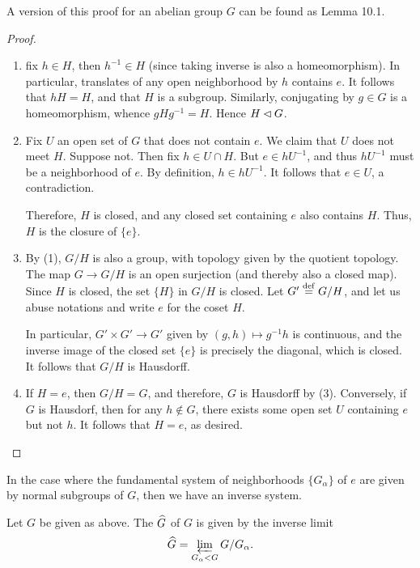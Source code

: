 A version of this proof for an abelian group $G$ can be found as
\cite{AM} Lemma 10.1.

\begin{proof}
\begin{enumerate}
\item fix $h \in H$, then $h^{-1} \in H$ (since taking inverse is 
also a homeomorphism). In particular, translates of any open 
neighborhood by $h$ contains $e$. It follows that $hH = H$, and 
that $H$ is a subgroup. Similarly, conjugating by $g \in G$ is a 
homeomorphism, whence $gHg^{-1} = H$. Hence $H \lhd G$.

\item Fix $U$ an open set of $G$ that does not contain $e$. We
claim that $U$ does not meet $H$. Suppose not. Then fix $h \in U 
\cap H$. But $e \in hU^{-1}$, and thus $hU^{-1}$ must be a 
neighborhood of $e$. By definition, $h \in hU^{-1}$. It follows
that $e \in U$, a contradiction.

Therefore, $H$ is closed, and any closed set containing $e$
also contains $H$. Thus, $H$ is the closure of $\{e\}$.

\item By (1), $G/H$ is also a group, with topology given by the
quotient topology. The map $G \to G/H$ is an open surjection (and 
thereby also a closed map). Since $H$ is closed, the set $\{H\}$ 
in $G/H$ is closed. Let $G' \stackrel{\mathrm{def}}{=} G/H$, and let us abuse 
notations and write $e$ for the coset $H$.

In particular, $G' \times G' \to G'$ given by $(g, h) \mapsto 
g^{-1}h$ is continuous, and the inverse image of the closed set 
$\{e\}$ is precisely the diagonal, which is closed. It follows 
that $G/H$ is Hausdorff.

\item If $H = e$, then $G/H = G$, and therefore, $G$ is Hausdorff
by (3). Conversely, if $G$ is Hausdorf, then for any $h \notin G$,
there exists some open set $U$ containing $e$ but not $h$. It
follows that $H = e$, as desired.
\end{enumerate}
\end{proof}

In the case where the fundamental system of neighborhoods 
$\{G_\alpha\}$ of $e$ are given by normal subgroups of $G$, then 
we have an inverse system.

\begin{defn}
Let $G$ be given as above. The 
$\widehat{G}$ of $G$ is given by the inverse limit
\[
\widehat{G} = \varprojlim_{G_\alpha < G} G/G_\alpha.
\]
\end{defn}


